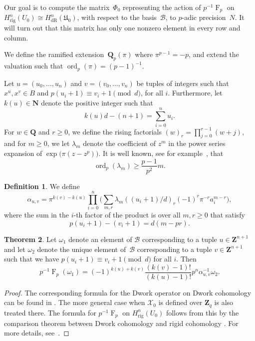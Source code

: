 \documentclass[a4paper,11pt]{article}
\numberwithin{equation}{section}
\newcommand{\NN}{\mathbf{N}} %
\newcommand{\ZZ}{\mathbf{Z}} %
\newcommand{\QQ}{\mathbf{Q}} %
\DeclareMathOperator{\ord}{ord}          %
\DeclareMathOperator{\Frob}{F}           %
\providecommand{\HdR}{H_{\text{dR}}}    %
\providecommand{\Hrig}{H_{\text{rig}}}  %
\providecommand{\cB}{\mathcal{B}} %
\theoremstyle{definition}
\newtheorem{thm}{Theorem}[section]
\newtheorem{defn}[thm]{Definition}
\begin{document}
Our goal is to compute 
the matrix~$\Phi_0$ representing the action of $p^{-1} \Frob_p$ on 
$\Hrig^n(U_0) \cong \HdR^n(\mathfrak{U}_0)$, with respect to the basis~$\cB$, 
to $p$-adic precision~$N$. It will turn out that this matrix has only one
nonzero element in every row and column.

We define the ramified extension~$\QQ_p(\pi)$ where $\pi^{p-1} = -p$, 
and extend the valuation such that \mbox{$\ord_p(\pi) = (p-1)^{-1}$}.

Let $u = (u_0, \dotsc, u_n)$ and $v = (v_0, \dotsc, v_n)$ be tuples 
of integers such that $x^u, x^v \in B$ and $p (u_i+1) \equiv v_i+1 \pmod{d}$,
for all $i$. Furthermore, let $k(u) \in \NN$ denote the positive integer such that 
\[
k(u) d -(n+1) = \sum_{i=0}^n u_i.
\] 
For $w \in \QQ$ 
and $r \geq 0$, we define the rising factorials $(w)_r = \prod_{j=0}^{r-1} (w + j)$, 
and for $m \geq 0$, we let $\lambda_m$ denote the coefficient of $z^m$ in the 
power series expansion of $\exp \bigl( \pi (z - z^p) \bigr)$. It is well known, see 
for example~\citep{Dwork1962}, that 
\begin{equation} \label{eqn:dworkbound}
\ord_p(\lambda_m) \geq \frac{p-1}{p^2} m. 
\end{equation}

\begin{defn} We define \label{defn:alpha}
\[
\alpha_{u,v} = \pi^{k(v) - k(u)} \prod_{i = 0}^n \biggl( \sum_{m, r} \lambda_m ((u_i + 1) / d)_r (-1)^r \pi^{-r} a_i^{m-r} \biggr),
\]
where the sum in the $i$-th factor of the product is over all $m, r \geq 0$  
that satisfy
\[
p(u_i+1)-(v_i+1)=d(m-pr).
\]
\end{defn}

\begin{thm} \label{thm:01-03-diagfrob}
Let $\omega_1$ denote an element of $\cB$ corresponding to a tuple 
$u \in \ZZ^{n+1}$ and let $\omega_2$ denote the unique element of~$\cB$ 
corresponding to a tuple $v \in \ZZ^{n+1}$ such that
we have $p (u_i + 1) \equiv v_i + 1 \pmod{d}$ for all $i$. Then
\begin{equation*}
p^{-1} \Frob_p (\omega_1) = 
    (-1)^{k(u) + k(v)} \frac{(k(v) - 1)!}{(k(u) - 1)!} p^n \alpha_{u,v}^{-1} \omega_2.
\end{equation*}
\end{thm}

\begin{proof}
The corresponding formula for the Dwork operator on Dwork cohomology can
be found in %
\citep[\S 6.1]{Lauder2004b}. The more general case when $\mathcal{X}_0$ 
is defined over $\ZZ_q$ is also treated there. The formula for 
$p^{-1} \Frob_p$ on $\Hrig^n(U_0)$ follows from this by the comparison theorem 
between Dwork cohomology and rigid cohomology \citep[Theorem 1.12]{Katz}. 
For more details, see~\citep[Theorem 4.4]{Gerkmann2007}.
\end{proof}
\end{document}
